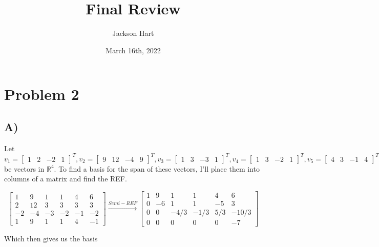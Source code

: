 \documentclass[12pt, letterpaper]{article}
\title{Final Review}
\author{Jackson Hart}
\date{March 16th, 2022}
\begin{document}
\maketitle

\section*{Problem 2}
\subsection*{A)}
Let $v_1 = \begin{bmatrix} 1 & 2 & -2 & 1 \end{bmatrix}^T, v_2 = \begin{bmatrix} 9 & 12 & -4 & 9 \end{bmatrix}^T, v_3 = \begin{bmatrix} 1 & 3 & -3 & 1 \end{bmatrix}^T, v_4 = \begin{bmatrix} 1 & 3 & -2 & 1 \end{bmatrix}^T, v_5 = \begin{bmatrix} 4 & 3 & -1 & 4 \end{bmatrix}^T, v_6 = \begin{bmatrix} 1 & 3 & -2 & -1 \end{bmatrix}$ be vectors in $\mathbb{R}^4$. To find a basis for the span of these vectors, I'll place them into columns of a matrix and find the REF.

\[ \begin{bmatrix} 1 & 9 & 1 & 1 & 4 & 6 \\ 2 & 12 & 3 & 3 & 3 & 3 \\ -2 & -4 & -3 & -2 & -1 & -2 \\ 1 & 9 & 1 & 1 & 4 & -1 \end{bmatrix} \xrightarrow{Semi-REF} \begin{bmatrix} 1 & 9 & 1 & 1 & 4 & 6 \\ 0 & -6 & 1 & 1 & -5 & 3 \\ 0 & 0 & -4/3 & -1/3 & 5/3 & -10/3 \\ 0 & 0 & 0 & 0 & 0 & -7 \end{bmatrix} \]

Which then gives us the basis
\end{document}
